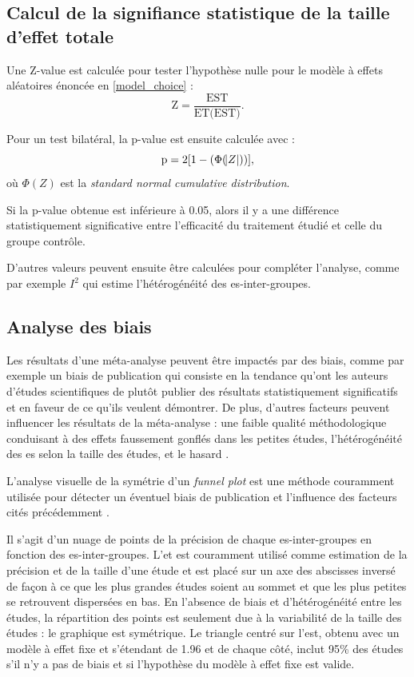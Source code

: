 \subsection{Calcul de la signifiance statistique de la taille d'effet totale}

Une Z-value est calculée pour tester l'hypothèse nulle pour le modèle à effets aléatoires énoncée en \ref{model_choice} :
\begin{equation}
\label{eq:metareview_confidence_interval_summary_effect_z_value}
\text{Z} = \frac{\text{EST}} {\text{ET(EST)}}.
\end{equation}

Pour un test bilatéral, la p-value est ensuite calculée avec :
\begin{equation}
\label{eq:metareview_confidence_interval_summary_effect_p_value}
\text{p} = 2[1 - (\Phi(\abs{Z}))],
\end{equation} 
où $\Phi(Z)$ est la \textit{standard normal cumulative distribution}.

Si la p-value obtenue est inférieure à 0.05, alors il y a une différence statistiquement significative entre l'efficacité du traitement étudié 
et celle du groupe contrôle.

D'autres valeurs peuvent ensuite être calculées pour compléter l'analyse, comme par exemple $I^2$ qui estime l'hétérogénéité des \gls{es}-inter-groupes. 

\subsection{Analyse des biais}

Les résultats d'une méta-analyse peuvent être impactés par des biais, comme par exemple un biais de publication qui consiste en la tendance qu'ont les auteurs 
d'études scientifiques de plutôt publier des résultats statistiquement significatifs et en faveur de ce qu'ils veulent démontrer. De plus,
d'autres facteurs peuvent influencer les résultats de la méta-analyse : une faible qualité méthodologique conduisant à des effets faussement gonflés
dans les petites études, l'hétérogénéité des \gls{es} selon la taille des études, et le hasard \citep{Sterne2011}.

L'analyse visuelle de la symétrie d'un \textit{funnel plot} est une méthode couramment utilisée pour détecter un éventuel biais de publication et 
l'influence des facteurs cités précédemment \citep{Sterne2011}.

Il s'agit d'un nuage de points de la précision de chaque \gls{es}-inter-groupes en fonction des \gls{es}-inter-groupes. L'\gls{et} est couramment 
utilisé comme estimation de la précision et de la taille d'une étude et est placé sur un axe des abscisses inversé de façon à ce que les plus grandes études 
soient au sommet et que les plus petites se retrouvent 
dispersées en bas. En l'absence de biais et d'hétérogénéité entre les études, la répartition des points est seulement due à la variabilité de la taille des études : 
le graphique est symétrique. Le triangle centré sur l'\gls{est}, obtenu avec un modèle à effet fixe et s'étendant de 1.96 \gls{et} de chaque côté, 
inclut 95\% des études s'il n'y a pas de biais et si l'hypothèse du modèle à effet fixe est valide.


